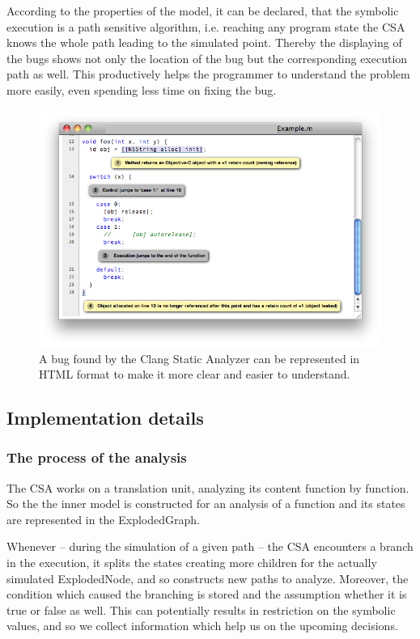 According to the properties of the model, it can be declared, that the symbolic 
execution is a path sensitive algorithm, i.e. reaching any program state the 
CSA knows the whole path leading to the simulated point. Thereby the displaying 
of the bugs shows not only the location of the bug but the corresponding 
execution path as well. This productively helps the programmer to understand 
the problem more easily, even spending less time on fixing the bug.

\begin{figure}[h]
	\centering
	\includegraphics[width=1\textwidth]{img/view}
	\caption{A bug found by the Clang Static Analyzer can be represented in 
	HTML format to make it more clear and easier to understand.}
	\label{fig:hibak_megjelenitese}
\end{figure}

\subsection{Implementation details}
\subsubsection{The process of the analysis}
The CSA works on a translation unit, analyzing its content function by function. So the the inner model is constructed for an analysis of a function and its states are represented in the ExplodedGraph.

Whenever -- during the simulation of a given path -- the CSA encounters a 
branch in the execution, it splits the states creating more children for the 
actually simulated ExplodedNode, and so constructs new paths to analyze. 
Moreover, the condition which caused the branching is stored and the assumption 
whether it is true or false as well. This can potentially results in 
restriction on the symbolic values, and so we collect information which help us 
on the upcoming decisions. 


